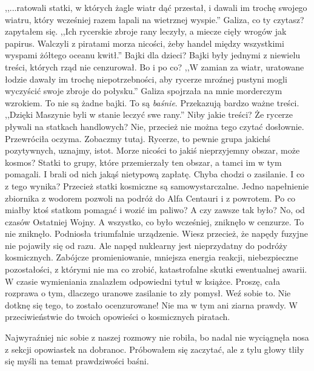 \begin{dialogue}
	\ds{} ,,...ratowali statki, w których żagle wiatr dąć przestał, i dawali im trochę swojego wiatru, który wcześniej razem łapali na wietrznej wyspie.''
	\ds{} Galiza, co ty czytasz? \dm{} zapytałem się.
	\ds{} ,,Ich rycerskie zbroje rany leczyły, a miecze cięły wrogów jak papirus. Walczyli z piratami morza nicości, żeby handel między wszystkimi wyspami żółtego oceanu kwitł.''
	\ds{} Bajki dla dzieci? \dm{} Bajki były jednymi z niewielu treści, których rząd nie cenzurował. Bo i po co?
	\ds{} ,,W zamian za wiatr, uratowane łodzie dawały im trochę niepotrzebności, aby rycerze mroźnej pustyni mogli wyczyścić swoje zbroje do połysku.'' \dm{} Galiza spojrzała na mnie morderczym wzrokiem. \dm{} To nie są żadne bajki. To są \emph{baśnie}. Przekazują bardzo ważne treści. ,,Dzięki Maszynie byli w stanie leczyć swe rany.''
	\ds{} Niby jakie treści? Że rycerze pływali na statkach handlowych?
	\ds{} Nie, przecież nie można tego czytać dosłownie. \dm{} Przewróciła oczyma. \dm{} Zobaczmy tutaj. Rycerze, to pewnie grupa jakichś pozytywnych, uznajmy, istot. Morze nicości to jakiś nieprzyjemny obszar, może kosmos? Statki to grupy, które przemierzały ten obszar, a tamci im w tym pomagali. I brali od nich jakąś nietypową zapłatę. Chyba chodzi o zasilanie.
	\ds{} I co z tego wynika? Przecież statki kosmiczne są samowystarczalne. Jedno napełnienie zbiornika z wodorem pozwoli na podróż do Alfa Centauri i z powrotem. Po co miałby ktoś statkom pomagać i wozić im paliwo?
	\ds{} A czy zawsze tak było?
	\ds{} No, od czasów Ostatniej Wojny. A wszystko, co było wcześniej, zniknęło w cenzurze.
	\ds{} To nie zniknęło. \dm{} Podniosła triumfalnie urządzenie. \dm{} Wiesz przecież, że napędy fuzyjne nie pojawiły się od razu.
	\ds{} Ale napęd nuklearny jest nieprzydatny do podróży kosmicznych. Zabójcze promieniowanie, mniejsza energia reakcji, niebezpieczne pozostałości, z którymi nie ma co zrobić, katastrofalne skutki ewentualnej awarii. \dm{} W czasie wymieniania znalazłem odpowiedni tytuł w książce. \dm{} Proszę, cała rozprawa o tym, dlaczego uranowe zasilanie to zły pomysł. Weź sobie to.
	\ds{} Nie dotknę się tego, to zostało ocenzurowane! Nie ma w tym ani ziarna prawdy.
	\ds{} W przeciwieństwie do twoich opowieści o kosmicznych piratach.
\end{dialogue}

Najwyraźniej nic sobie z naszej rozmowy nie robiła, bo nadal nie wyciągnęła nosa z sekcji opowiastek na dobranoc.
Próbowałem się zaczytać, ale z tylu głowy tliły się myśli na temat prawdziwości baśni.

